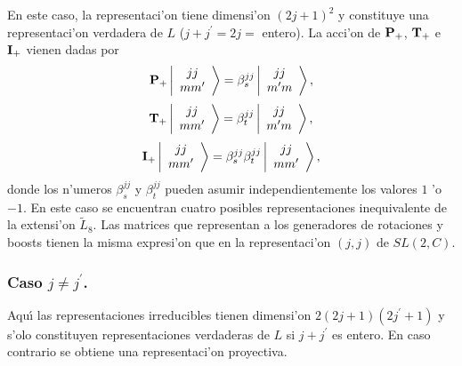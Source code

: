 En este caso, la representaci'on tiene dimensi'on $(2j+1)^2$ y
constituye una representaci'on verdadera de $L$ ($j+j^{\prime }=2j=$
entero). La acci'on de ${\bf P}_{+}$, ${\bf T}_{+}$ e ${\bf I}_{+}$
vienen dadas por 
\begin{equation}
{\bf P}_{+}\left| 
\begin{array}{c}
jj \\ 
mm^{\prime }
\end{array}
\right\rangle =\beta _{s}^{jj}\left| 
\begin{array}{c}
jj \\ 
m^{\prime }m
\end{array}
\right\rangle , 
\end{equation}
\begin{equation}
{\bf T}_{+}\left| 
\begin{array}{c}
jj \\ 
mm^{\prime }
\end{array}
\right\rangle =\beta _{t}^{jj}\left| 
\begin{array}{c}
jj \\ 
m^{\prime }m
\end{array}
\right\rangle , 
\end{equation}
\begin{equation}
{\bf I}_{+}\left| 
\begin{array}{c}
jj \\ 
mm^{\prime }
\end{array}
\right\rangle =\beta _{s}^{jj}\beta _{t}^{jj}\left| 
\begin{array}{c}
jj \\ 
mm^{\prime }
\end{array}
\right\rangle , 
\end{equation}
donde los n'umeros $\beta _{s}^{jj}$ y $\beta _{t}^{jj}$ pueden asumir
independientemente los valores $1$ 'o $-1$. En este caso se encuentran
cuatro posibles representaciones inequivalente de la extensi'on $%
\widetilde{L}_{8}$. Las matrices que representan a los generadores de
rotaciones y boosts tienen la misma expresi'on que en la
representaci'on $\left( j,j\right) $ de $SL(2,C)$.

\subsubsection{Caso $j\neq j^{\prime }$.}

Aqu{\'\i} las representaciones irreducibles tienen dimensi'on $2\left(
2j+1\right) \left( 2j^{\prime }+1\right) $ y s'olo constituyen
representaciones verdaderas de $L$ si $j+j^{\prime }$ es entero. En caso
contrario se obtiene una representaci'on proyectiva.

